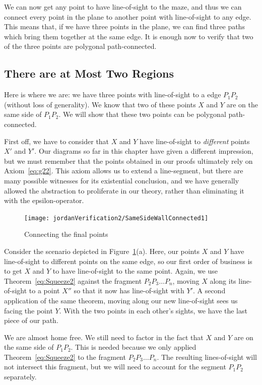 We can now get any point to have line-of-sight to the maze, and thus we can connect every point in the plane to another point with line-of-sight to any edge. This means that, if we have three points in the plane, we can find three paths which bring them together at the same edge. It is enough now to verify that two of the three points are polygonal path-connected.

\subsection{There are at Most Two Regions}\label{sec:SameSideEdgeConnected}
Here is where we are: we have three points with line-of-sight to a edge $P_1P_2$ (without loss of generality). We know that two of these points $X$ and $Y$ are on the same side of $P_1P_2$. We will show that these two points can be polygonal path-connected.

First off, we have to consider that $X$ and $Y$ have line-of-sight to \emph{different} points $X'$ and $Y'$. Our diagrams so far in this chapter have given a different impression, but we must remember that the points obtained in our proofs ultimately rely on Axiom~\ref{eq:g22}. This axiom allows us to extend a line-segment, but there are many possible witnesses for its existential conclusion, and we have generally allowed the abstraction to proliferate in our theory, rather than eliminating it with the epsilon-operator. 

\begin{figure}
\centering\texttt{[image: jordanVerification2/SameSideWallConnected1]}
\caption{Connecting the final points}
\label{fig:SameSideEdgeConnected}
\end{figure}

Consider the scenario depicted in Figure~\ref{fig:SameSideEdgeConnected}(a). Here, our points $X$ and $Y$ have line-of-sight to different points on the same edge, so our first order of business is to get $X$ and $Y$ to have line-of-sight to the same point. Again, we use Theorem~\ref{eq:Squeeze2} against the fragment $P_2P_3\ldots P_n$, moving $X$ along its line-of-sight to a point $X''$ so that it now has line-of-sight with $Y'$. A second application of the same theorem, moving along our new line-of-sight sees us facing the point $Y$. With the two points in each other's sights, we have the last piece of our path.

We are almost home free. We still need to factor in the fact that $X$ and $Y$ are on the same side of $P_1P_2$. This is needed because we only applied Theorem~\ref{eq:Squeeze2} to the fragment $P_2P_3\ldots P_n$. The resulting lines-of-sight will not intersect this fragment, but we will need to account for the segment $P_1P_2$ separately.

